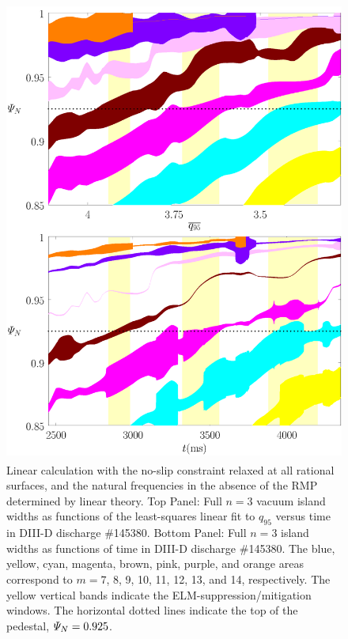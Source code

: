 \documentclass[12pt,prb,aps]{revtex4-1}
\begin{document}
\begin{figure}
\includegraphics[height=6in]{fig8.pdf}
\caption{Linear calculation with the no-slip constraint relaxed at all rational surfaces, and  the natural frequencies
in the absence of the RMP determined by linear theory. Top Panel: Full  $n=3$ vacuum island widths as functions of the least-squares linear fit to $q_{95}$ versus time 
in   DIII-D discharge \#145380.
Bottom Panel:  Full $n=3$ island widths as functions of time
in   DIII-D discharge \#145380. The blue, yellow, cyan, magenta, brown, pink,
purple, and orange  areas correspond to $m=7$, 8, 9, 10, 11, 12, 13, and 14, respectively. The yellow vertical bands indicate the ELM-suppression/mitigation windows. 
The horizontal dotted lines indicate the top of the pedestal, ${\mit\Psi}_N=0.925$.} \label{fig8}
\end{figure}
\end{document}
